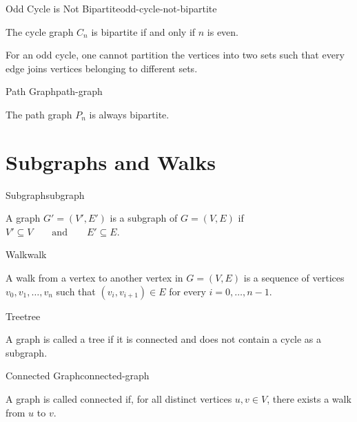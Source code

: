 \begin{example}{Odd Cycle is Not Bipartite}{odd-cycle-not-bipartite}

The cycle graph $C_n$ is bipartite if and only if $n$ is even.

For an odd cycle, one cannot partition the vertices into two sets such
that every edge joins vertices belonging to different sets.

\end{example}


\begin{example}{Path Graph}{path-graph}

The path graph $P_n$ is always bipartite.

\end{example}


\section{Subgraphs and Walks}

\begin{definition}{Subgraph}{subgraph}

A graph
\(
G'=(V',E')
\)
is a subgraph of
\(
G=(V,E)
\)
if
\(
V'\subseteq V
\qquad\text{and}\qquad
E'\subseteq E.
\)

\end{definition}


\begin{definition}{Walk}{walk}

A walk from a vertex to another vertex in
\(
G=(V,E)
\)
is a sequence of vertices
\(
v_0,v_1,\ldots,v_n
\)
such that
\(
(v_i,v_{i+1})\in E
\)
for every
\(
i=0,\ldots,n-1.
\)

\end{definition}


\begin{definition}{Tree}{tree}

A graph is called a tree if it is connected and does not contain a
cycle as a subgraph.

\end{definition}


\begin{definition}{Connected Graph}{connected-graph}

A graph is called connected if, for all distinct vertices
$u,v\in V$, there exists a walk from $u$ to $v$.

\end{definition}


